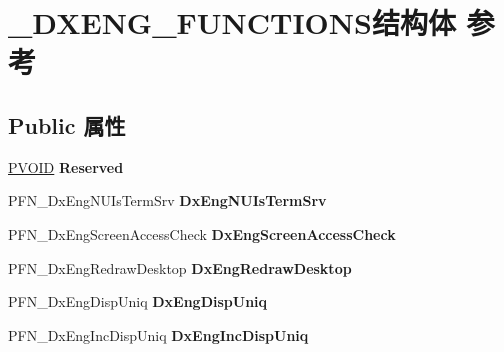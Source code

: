 \hypertarget{struct___d_x_e_n_g___f_u_n_c_t_i_o_n_s}{}\section{\+\_\+\+D\+X\+E\+N\+G\+\_\+\+F\+U\+N\+C\+T\+I\+O\+N\+S结构体 参考}
\label{struct___d_x_e_n_g___f_u_n_c_t_i_o_n_s}
\subsection*{Public 属性}
\begin{DoxyCompactItemize}
\item 
\mbox{\label{struct___d_x_e_n_g___f_u_n_c_t_i_o_n_s_a89a2d6a05c3edb219e1dd77009054618}} 
\hyperlink{interfacevoid}{P\+V\+O\+ID} {\bfseries Reserved}
\item 
\mbox{\label{struct___d_x_e_n_g___f_u_n_c_t_i_o_n_s_a8d2f48b8e22b6032296c56f34f00ed92}} 
P\+F\+N\+\_\+\+Dx\+Eng\+N\+U\+Is\+Term\+Srv {\bfseries Dx\+Eng\+N\+U\+Is\+Term\+Srv}
\item 
\mbox{\label{struct___d_x_e_n_g___f_u_n_c_t_i_o_n_s_ab00d5d399aa63b44d79746919b4f7e91}} 
P\+F\+N\+\_\+\+Dx\+Eng\+Screen\+Access\+Check {\bfseries Dx\+Eng\+Screen\+Access\+Check}
\item 
\mbox{\label{struct___d_x_e_n_g___f_u_n_c_t_i_o_n_s_a35ed1deb7d484a6a75317840a2d8fa4d}} 
P\+F\+N\+\_\+\+Dx\+Eng\+Redraw\+Desktop {\bfseries Dx\+Eng\+Redraw\+Desktop}
\item 
\mbox{\label{struct___d_x_e_n_g___f_u_n_c_t_i_o_n_s_a6d629be45bd75b7ee727e70be3172a60}} 
P\+F\+N\+\_\+\+Dx\+Eng\+Disp\+Uniq {\bfseries Dx\+Eng\+Disp\+Uniq}
\item 
\mbox{\label{struct___d_x_e_n_g___f_u_n_c_t_i_o_n_s_aba2b10fa0f524259791a6940c50b19b2}} 
P\+F\+N\+\_\+\+Dx\+Eng\+Inc\+Disp\+Uniq {\bfseries Dx\+Eng\+Inc\+Disp\+Uniq}
\item 
\mbox{\label{struct___d_x_e_n_g___f_u_n_c_t_i_o_n_s_a3ddda35d301102bca0cb2200d1584186}} 

\end{DoxyCompactItemize}
